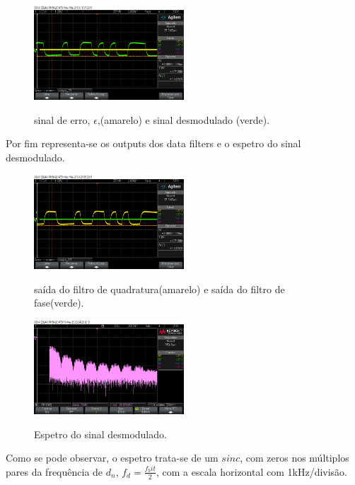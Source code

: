 \documentclass[11pt]{article}
\numberwithin{equation}{section}
\begin{document}
\begin{figure}[H]
	\centering
	\includegraphics[width=0.5\textwidth]{./erro_y1n}~\\
	\caption{sinal de erro, $\epsilon$,(amarelo) e sinal desmodulado (verde).}
	\label{erro_y1n}
\end{figure}

Por fim representa-se os outputs dos data filters e o espetro do sinal desmodulado.

\begin{figure}[H]
	\centering
	\includegraphics[width=0.5\textwidth]{./y1_y2n}~\\
	\caption{saída do filtro de quadratura(amarelo) e saída do filtro de fase(verde).}
	\label{y1_y2n}
\end{figure}

\begin{figure}[H]
	\centering
	\includegraphics[width=0.5\textwidth]{./espetro}~\\
	\caption{Espetro do sinal desmodulado.}
	\label{espetro}
\end{figure}

Como se pode observar, o espetro trata-se de um $sinc$, com zeros nos múltiplos pares da frequência de $d_n$, $f_d=\frac{f_bit}{2}$, com a escala horizontal com 1kHz/divisão.
\end{document}
